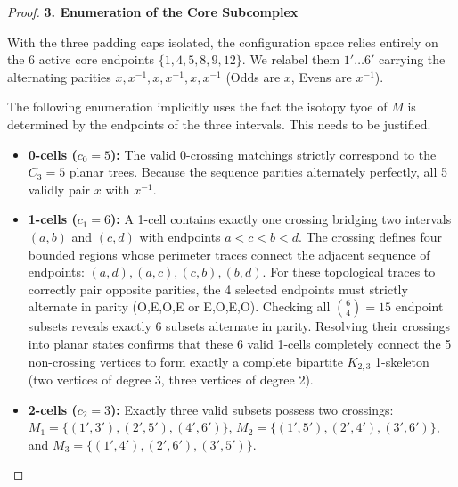\documentclass[12pt]{article}
\newcommand{\review}[1]{\begin{reviewbox}#1\end{reviewbox}}
\begin{document}
\begin{proof}
\vspace{1em}
\noindent\textbf{3. Enumeration of the Core Subcomplex}

With the three padding caps isolated, the configuration space relies entirely on the 6 active core endpoints $\{1, 4, 5, 8, 9, 12\}$. We relabel them $1' \dots 6'$ carrying the alternating parities $x, x^{-1}, x, x^{-1}, x, x^{-1}$ (Odds are $x$, Evens are $x^{-1}$).
\review{The following enumeration implicitly uses the fact the isotopy tyoe of $M$ is determined by the endpoints of the three intervals. This needs to be justified.}
\begin{itemize}
    \item \textbf{0-cells ($c_0=5$):} The valid 0-crossing matchings strictly correspond to the $C_3 = 5$ planar trees. Because the sequence parities alternately perfectly, all 5 validly pair $x$ with $x^{-1}$.
    \item \textbf{1-cells ($c_1=6$):} A 1-cell contains exactly one crossing bridging two intervals $(a,b)$ and $(c,d)$ with endpoints $a < c < b < d$. The crossing defines four bounded regions whose perimeter traces connect the adjacent sequence of endpoints: $(a,d), (a,c), (c,b), (b,d)$. For these topological traces to correctly pair opposite parities, the 4 selected endpoints must strictly alternate in parity (O,E,O,E or E,O,E,O). Checking all $\binom{6}{4}=15$ endpoint subsets reveals exactly 6 subsets alternate in parity. Resolving their crossings into planar states confirms that these 6 valid 1-cells completely connect the 5 non-crossing vertices to form exactly a complete bipartite $K_{2,3}$ 1-skeleton (two vertices of degree 3, three vertices of degree 2).
    \item \textbf{2-cells ($c_2=3$):} Exactly three valid subsets possess two crossings: $M_1 = \{(1',3'), (2',5'), (4',6')\}$, $M_2 = \{(1',5'), (2',4'), (3',6')\}$, and $M_3 = \{(1',4'), (2',6'), (3',5')\}$. 
    

\end{itemize}
\end{proof}
\end{document}
